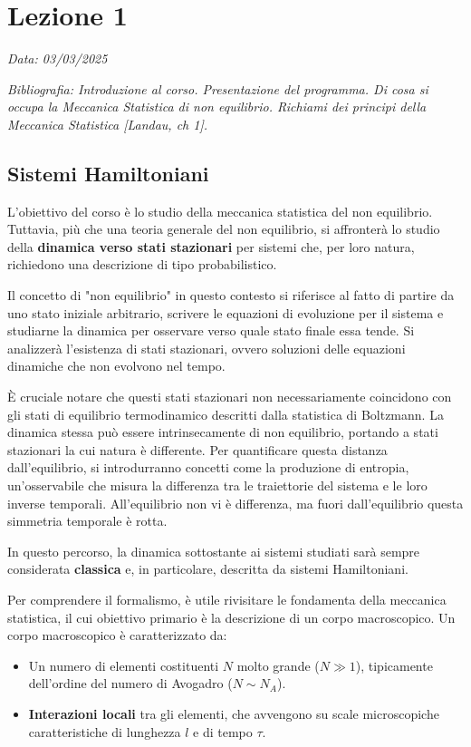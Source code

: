 
\chapter{Lezione 1}
\label{chap:lezione_01} %

\begin{flushright}
\textit{Data: 03/03/2025}
\end{flushright}
\textit{Bibliografia: Introduzione al corso. Presentazione del programma. Di cosa si occupa la Meccanica Statistica di non equilibrio. Richiami dei principi della Meccanica Statistica [Landau, ch 1].}

\section{Sistemi Hamiltoniani}

L'obiettivo del corso è lo studio della meccanica statistica del non equilibrio. Tuttavia, più che una teoria generale del non equilibrio, si affronterà lo studio della \textbf{dinamica verso stati stazionari} per sistemi che, per loro natura, richiedono una descrizione di tipo probabilistico.

Il concetto di "non equilibrio" in questo contesto si riferisce al fatto di partire da uno stato iniziale arbitrario, scrivere le equazioni di evoluzione per il sistema e studiarne la dinamica per osservare verso quale stato finale essa tende. Si analizzerà l'esistenza di stati stazionari, ovvero soluzioni delle equazioni dinamiche che non evolvono nel tempo.

È cruciale notare che questi stati stazionari non necessariamente coincidono con gli stati di equilibrio termodinamico descritti dalla statistica di Boltzmann. La dinamica stessa può essere intrinsecamente di non equilibrio, portando a stati stazionari la cui natura è differente. Per quantificare questa distanza dall'equilibrio, si introdurranno concetti come la produzione di entropia, un'osservabile che misura la differenza tra le traiettorie del sistema e le loro inverse temporali. All'equilibrio non vi è differenza, ma fuori dall'equilibrio questa simmetria temporale è rotta.

In questo percorso, la dinamica sottostante ai sistemi studiati sarà sempre considerata \textbf{classica} e, in particolare, descritta da sistemi Hamiltoniani.

\hspace{0.2 cm}

Per comprendere il formalismo, è utile rivisitare le fondamenta della meccanica statistica, il cui obiettivo primario è la descrizione di un corpo macroscopico. Un corpo macroscopico è caratterizzato da:
\begin{itemize}
    \item Un numero di elementi costituenti $N$ molto grande ($N \gg 1$), tipicamente dell'ordine del numero di Avogadro ($N \sim N_A$).
    \item \textbf{Interazioni locali} tra gli elementi, che avvengono su scale microscopiche caratteristiche di lunghezza $l$ e di tempo $\tau$.
\end{itemize}


